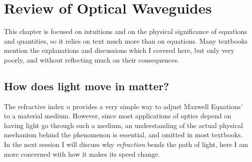 \chapter{Review of Optical Waveguides}

This chapter is focused on intuitions and on the physical significance of equations and quantities, so it relies on text much more than on equations. Many textbooks mention the explanations and discussions which I covered here, but only very poorly, and without reflecting much on their consequences.

\section{How does light move in matter?}

The refractive index $n$ provides a very simple way to adjust Maxwell Equations' to a material medium. However, since most applications of optics depend on having light go through such a medium, an understanding of the actual physical mechanism behind the phenomenon is essential, and omitted in most textbooks. In the next session I will discuss why \textit{refraction} bends the path of light, here I am more concerned with how it makes its speed change.

